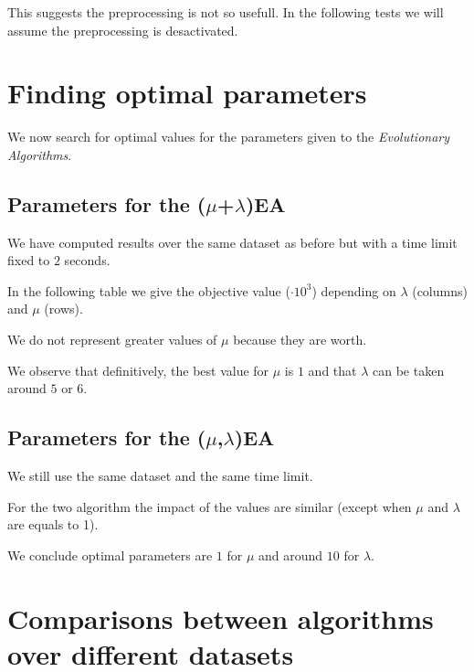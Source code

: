 \documentclass[a4paper]{article}
\begin{document}
This suggests the preprocessing is not so usefull. In the following tests we will assume the preprocessing is desactivated.

\section{Finding optimal parameters}

We now search for optimal values for the parameters given to the \textit{Evolutionary Algorithms}.

\subsection{Parameters for the ($\mu$+$\lambda$)EA}

We have computed results over the same dataset as before but with a time limit fixed to $2$ seconds.

In the following table we give the objective value ($\cdot 10^3$) depending on $\lambda$ (columns) and $\mu$ (rows). 

\begin{center}
\end{center}


We do not represent greater values of $\mu$ because they are worth.

We observe that definitively, the best value for $\mu$ is $1$ and that $\lambda$ can be taken around $5$ or $6$.


\subsection{Parameters for the ($\mu$,$\lambda$)EA}

We still use the same dataset and the same time limit.

\begin{center}
\end{center}

For the two algorithm the impact of the values are similar (except when $\mu$ and $\lambda$ are equals to 1).

We conclude optimal parameters are $1$ for $\mu$ and around $10$ for $\lambda$.

\section{Comparisons between algorithms over different datasets}
\end{document}
